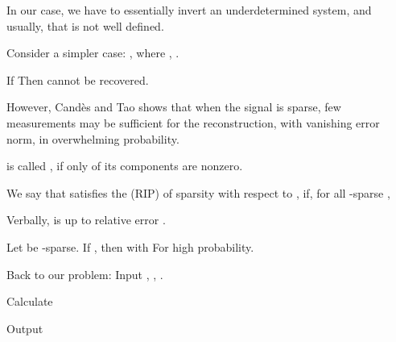 {
\I In our case, we have to essentially invert an underdetermined system, and usually, that is not well defined.

\I Consider a simpler case: , where , .

\I If 
Then  cannot be recovered.
}
{
\I However, Candès and Tao shows that when the signal is sparse, few measurements may be sufficient for the reconstruction, with vanishing error norm, in overwhelming probability.

\I {} is called , if only  of its components are nonzero.

\I We say that  satisfies the  (RIP) of sparsity  with respect to , if, for all -sparse ,

\I Verbally,  is  up to relative error .
}
{
\I Let  be -sparse.
If , then
with
For high probability.
}
{
\I Back to our problem: Input , , .

\I Calculate

\I Output 
}

